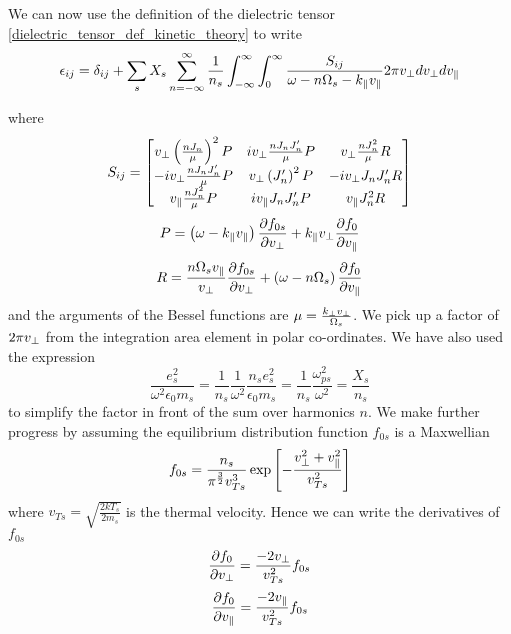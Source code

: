 We can now use the definition of the dielectric tensor \eqref{dielectric_tensor_def_kinetic_theory} to write
\begin{equation} \label{hot_plasma_dielectric_generic_f}
	\epsilon_{ij} = \delta_{ij} + \sum_s X_s \sum_{n=-\infty}^\infty \frac{1}{n_s} \int_{-\infty}^\infty \int_0^\infty \frac{S_{ij}}{\omega - n\Omega_s - k_\parallel v_\parallel} 2\pi v_\perp dv_\perp dv_\parallel
\end{equation}

where
\begin{equation}
	S_{ij} =
	\begin{bmatrix}
		v_\perp \left(\frac{nJ_n}{\mu}\right)^2 P & iv_\perp \frac{nJ_nJ_n'}{\mu} P & v_\perp \frac{nJ_n^2}{\mu} R\\
		- iv_\perp \frac{nJ_nJ_n'}{\mu} P & v_\perp \left(J_n'\right)^2 P & -i v_\perp J_n J_n' R\\
		v_\parallel \frac{nJ_n^2}{\mu} P & i v_\parallel J_n J_n' P & v_\parallel J_n^2 R\\
	\end{bmatrix}
\end{equation}
\begin{equation*}
	P = \left(\omega - k_\parallel v_\parallel\right)\frac{\partial f_{0s}}{\partial v_\perp} + k_\parallel v_\perp\frac{\partial f_0}{\partial v_\parallel}
\end{equation*}
\begin{equation*}
	R = \frac{n\Omega_s v_\parallel}{v_\perp} \frac{\partial f_{0s}}{\partial v_\perp} + \left(\omega - n\Omega_s \right) \frac{\partial f_0}{\partial v_\parallel}
\end{equation*}
and the arguments of the Bessel functions are $\mu = \frac{k_\perp v_\perp}{\Omega_s}$. We pick up a factor of $2\pi v_\perp$ from the integration area element in polar co-ordinates. We have also used the expression
\begin{equation*}
	\frac{e_s^2}{\omega^2 \epsilon_0 m_s} = \frac{1}{n_s} \frac{1}{\omega^2} \frac{n_s e_s^2}{\epsilon_0 m_s} = \frac{1}{n_s} \frac{\omega_{ps}^2}{\omega^2} = \frac{X_s}{n_s}
\end{equation*}
to simplify the factor in front of the sum over harmonics $n$. We make further progress by assuming the equilibrium distribution function $f_{0s}$ is a Maxwellian
\begin{equation}
	f_{0s} = \frac{n_s}{\pi^{\frac{3}{2}}v_{Ts}^3} \exp \left[ - \frac{v_\perp^2 + v_\parallel^2}{v_{Ts}^2} \right]
\end{equation}
where $v_{Ts} = \sqrt{\frac{2kT_s}{2m_s}}$ is the thermal velocity. Hence we can write the derivatives of $f_{0s}$
\begin{equation}
	\frac{\partial f_0}{\partial v_\perp} = \frac{-2v_\perp}{v_{Ts}^2} f_{0s}
\end{equation}
\begin{equation}
	\frac{\partial f_0}{\partial v_\parallel} = \frac{-2v_\parallel}{v_{Ts}^2} f_{0s}
\end{equation}


